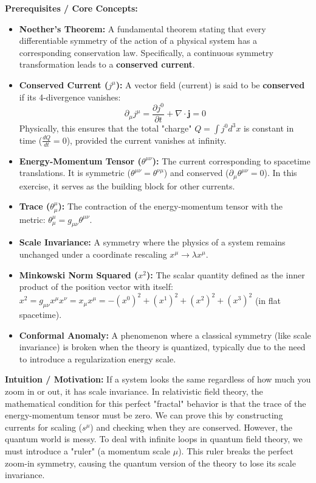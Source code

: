\begin{solution}
\textbf{Prerequisites / Core Concepts:}
\begin{itemize}
    \item \textbf{Noether's Theorem:} A fundamental theorem stating that every differentiable symmetry of the action of a physical system has a corresponding conservation law. Specifically, a continuous symmetry transformation leads to a \textbf{conserved current}.
    \item \textbf{Conserved Current ($j^\mu$):} A vector field (current) is said to be \textbf{conserved} if its 4-divergence vanishes:
    \[ \partial_\mu j^\mu = \frac{\partial j^0}{\partial t} + \nabla \cdot \mathbf{j} = 0 \]
    Physically, this ensures that the total "charge" $Q = \int j^0 d^3x$ is constant in time ($\frac{dQ}{dt} = 0$), provided the current vanishes at infinity.
    \item \textbf{Energy-Momentum Tensor ($\theta^{\mu\nu}$):} The current corresponding to spacetime translations. It is symmetric ($\theta^{\mu\nu} = \theta^{\nu\mu}$) and conserved ($\partial_\mu \theta^{\mu\nu} = 0$). In this exercise, it serves as the building block for other currents.
    \item \textbf{Trace ($\theta^\mu_\mu$):} The contraction of the energy-momentum tensor with the metric: $\theta^\mu_\mu = g_{\mu\nu} \theta^{\mu\nu}$.
    \item \textbf{Scale Invariance:} A symmetry where the physics of a system remains unchanged under a coordinate rescaling $x^\mu \to \lambda x^\mu$.
    \item \textbf{Minkowski Norm Squared ($x^2$):} The scalar quantity defined as the inner product of the position vector with itself: $x^2 = g_{\mu\nu} x^\mu x^\nu = x_\mu x^\mu = -(x^0)^2 + (x^1)^2 + (x^2)^2 + (x^3)^2$ (in flat spacetime).
    \item \textbf{Conformal Anomaly:} A phenomenon where a classical symmetry (like scale invariance) is broken when the theory is quantized, typically due to the need to introduce a regularization energy scale.
\end{itemize}

\textbf{Intuition / Motivation:}
If a system looks the same regardless of how much you zoom in or out, it has scale invariance. In relativistic field theory, the mathematical condition for this perfect "fractal" behavior is that the trace of the energy-momentum tensor must be zero. We can prove this by constructing currents for scaling ($s^\mu$) and checking when they are conserved. However, the quantum world is messy. To deal with infinite loops in quantum field theory, we must introduce a "ruler" (a momentum scale $\mu$). This ruler breaks the perfect zoom-in symmetry, causing the quantum version of the theory to lose its scale invariance.


\end{solution}
